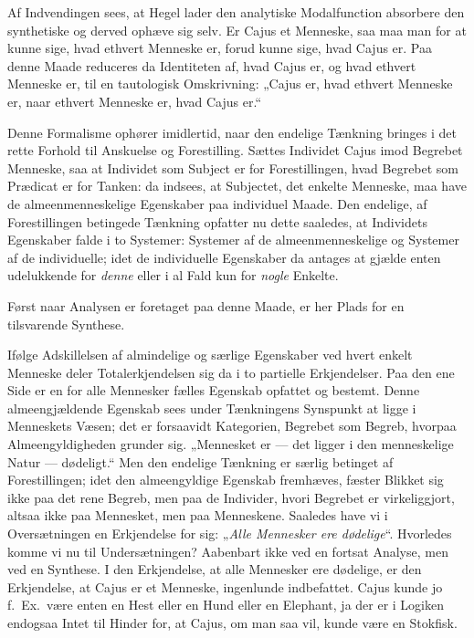 \documentclass[12pt]{book}
\newcommand{\opage}[1]{\marginnote{\footnotesize\textit{[#1]}}}
\begin{document}
Af Indvendingen sees, at Hegel lader den analytiske Modalfunction absorbere den synthetiske og derved ophæve sig selv. Er Cajus et Menneske, saa maa man for at kunne sige, hvad ethvert Menneske er, forud kunne sige, hvad Cajus er. Paa denne Maade reduceres da Identiteten af, hvad Cajus er, og hvad ethvert Menneske er, til en tautologisk Omskrivning: „Cajus er, hvad ethvert Menneske er, naar ethvert Menneske er, hvad Cajus er.“

Denne Formalisme ophører imidlertid, naar den endelige Tænkning bringes i det rette Forhold til Anskuelse og Forestilling. Sættes Individet Cajus imod Begrebet Menneske, saa at Individet som Subject er for Forestillingen, hvad Begrebet som Prædicat er for Tanken: da indsees, at Subjectet, det enkelte Menneske, maa have de almeenmenneskelige Egenskaber paa individuel Maade. Den endelige, af Forestillingen betingede Tænkning opfatter nu dette saaledes, at Individets Egenskaber falde i to Systemer: Systemer af de almeenmenneskelige og Systemer af de individuelle; idet de individuelle Egenskaber da antages at gjælde enten udelukkende for \emph{denne} eller i al Fald kun for \emph{nogle} Enkelte.

\opage{314}Først naar Analysen er foretaget paa denne Maade, er her Plads for en tilsvarende Synthese.

Ifølge Adskillelsen af almindelige og særlige Egenskaber ved hvert enkelt Menneske deler Totalerkjendelsen sig da i to partielle Erkjendelser. Paa den ene Side er en for alle Mennesker fælles Egenskab opfattet og bestemt. Denne almeengjældende Egenskab sees under Tænkningens Synspunkt at ligge i Menneskets Væsen; det er forsaavidt Kategorien, Begrebet som Begreb, hvorpaa Almeengyldigheden grunder sig. „Mennesket er --- det ligger i den menneskelige Natur --- dødeligt.“ Men den endelige Tænkning er særlig betinget af Forestillingen; idet den almeengyldige Egenskab fremhæves, fæster Blikket sig ikke paa det rene Begreb, men paa de Individer, hvori Begrebet er virkeliggjort, altsaa ikke paa Mennesket, men paa Menneskene. Saaledes have vi i Oversætningen en Erkjendelse for sig: „\emph{Alle Mennesker ere dødelige}“. Hvorledes komme vi nu til Undersætningen? Aabenbart ikke ved en fortsat Analyse, men ved en Synthese. I den Erkjendelse, at alle Mennesker ere dødelige, er den Erkjendelse, at Cajus er et Menneske, ingenlunde indbefattet. Cajus kunde jo f.\ Ex.\ være enten en Hest eller en Hund eller en Elephant, ja der er i Logiken endogsaa Intet til Hinder for, at Cajus, om man saa vil, kunde være en Stokfisk.
\end{document}
